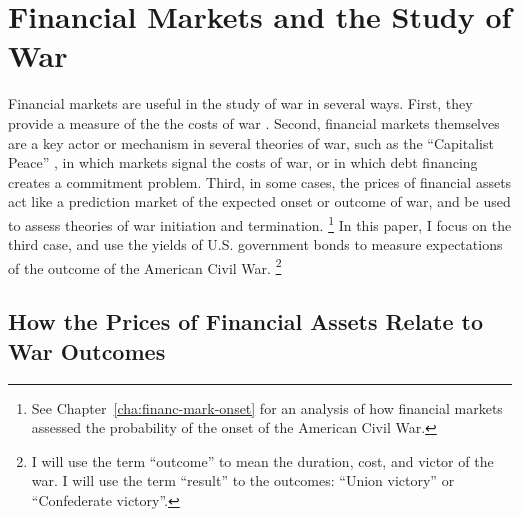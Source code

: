 


\section{Financial Markets and the Study of War}
\label{bonds_battles:sec:barg-theory-war}

Financial markets are useful in the study of war in several ways.
First, they provide a measure of the the costs of war \parencites{SchneiderTroeger2006}{GuidolinLaFerrara2010}.
Second, financial markets themselves are a key actor or mechanism in several theories of war, such as the ``Capitalist Peace'' \parencites{Gartzke2007}{DafoeKelsey2014a}, in which markets signal the costs of war, or \textcite{Slantchev2012a} in which debt financing creates a commitment problem.
Third, in some cases, the prices of financial assets act like a prediction market of the expected onset or outcome of war, and be used to assess theories of war initiation and termination.%
\footnote{See Chapter~\ref{cha:financ-mark-onset} for an analysis of how financial markets assessed the probability of the onset of the American Civil War.}
In this paper, I focus on the third case, and use the yields of U.S. government bonds to measure expectations of the outcome of the American Civil War.%
\footnote{I will use the term ``outcome'' to mean the duration, cost, and victor of the war. I will use the term ``result'' to the outcomes: ``Union victory'' or ``Confederate victory''.}


\subsection{How the Prices of Financial Assets Relate to War Outcomes}
\label{bonds_battles:sec:how-prices-financial}

